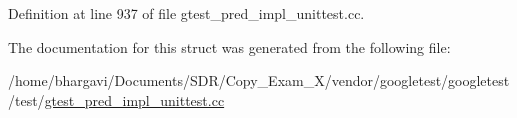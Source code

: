 Definition at line 937 of file gtest\+\_\+pred\+\_\+impl\+\_\+unittest.\+cc.



The documentation for this struct was generated from the following file\+:\begin{DoxyCompactItemize}
\item 
/home/bhargavi/\+Documents/\+S\+D\+R/\+Copy\+\_\+\+Exam\+\_\+X/vendor/googletest/googletest/test/\hyperlink{gtest__pred__impl__unittest_8cc}{gtest\+\_\+pred\+\_\+impl\+\_\+unittest.\+cc}\end{DoxyCompactItemize}
